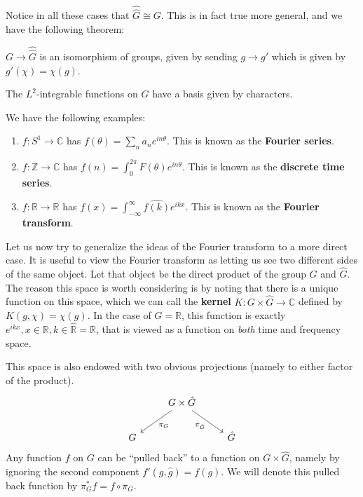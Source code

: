 Notice in all these cases that $\widehat{\widehat G} \cong G$. This is in fact true more general, and we have the following theorem:
\begin{theorem}
	$G \to \widehat{\widehat G}$ is an isomorphism of groups, given by sending $g \to  g'$ which is given by $g' (\chi) = \chi (g)$.
\end{theorem}

\begin{obs}
	The $L^2$-integrable functions on $G$ have a basis given by characters. 
\end{obs}
\begin{eg}
	We have the following examples:
	\begin{enumerate}
		\item $f: S^1 \to \mathbb C$ has $f(\theta) = \sum_{n} a_n e^{i n \theta}$. This is known as the \textbf{Fourier series}.
		\item $f: \mathbb Z \to \mathbb C$ has $f(n) = \int_{0}^{2\pi} F(\theta) e^{i n \theta}$. This is known as the \textbf{discrete time series}.
		\item $f: \mathbb R \to \mathbb R$ has $f(x) = \int_{-\infty}^\infty \widehat{f(k)} e^{ikx}$. This is known as the \textbf{Fourier transform}.
	\end{enumerate}
\end{eg}

Let us now try to generalize the ideas of the Fourier transform to a more direct case. It is useful to view the Fourier transform as letting us see two different sides of the same object. Let that object be the direct product of the group $G$ and $\hat G$. 
The reason this space is worth considering is by noting that there is a unique function on this space, which we can call the \textbf{kernel} $K: G \times \hat G \to \mathbb C$ defined by $K(g, \chi) = \chi (g)$. In the case of  $G=\mathbb R$, this function is exactly $e^{i k x}, x \in \mathbb R, k \in \widehat{ \mathbb R} = \mathbb R$, that is viewed as a function on \emph{both} time and frequency space.

This space is also endowed with two obvious projections (namely to either factor of the product).		
\[
\begin{tikzcd}
  & G \times \hat G \arrow[ld,"\pi_G"] \arrow[rd,swap,"\pi_{\hat G}"]&\\
G & & \hat G
\end{tikzcd}
\]
Any function $f$ on $G$ can be ``pulled back'' to a function on $G \times \hat G$, namely by ignoring the second component $f'(g, \hat g) = f(g)$. We will denote this pulled back function by $\pi_{G}^* f = f \circ \pi_G$.


